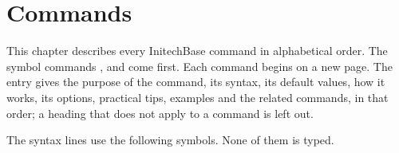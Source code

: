 \chapter{Commands}
This chapter describes every InitechBase command in alphabetical order.  The
symbol commands ,  and  come first.  Each command begins on a new
page.  The entry gives the purpose of the command, its syntax, its default
values, how it works, its options, practical tips, examples and the related
commands, in that order; a heading that does not apply to a command is left
out.

The syntax lines use the following symbols.  None of them is typed.


